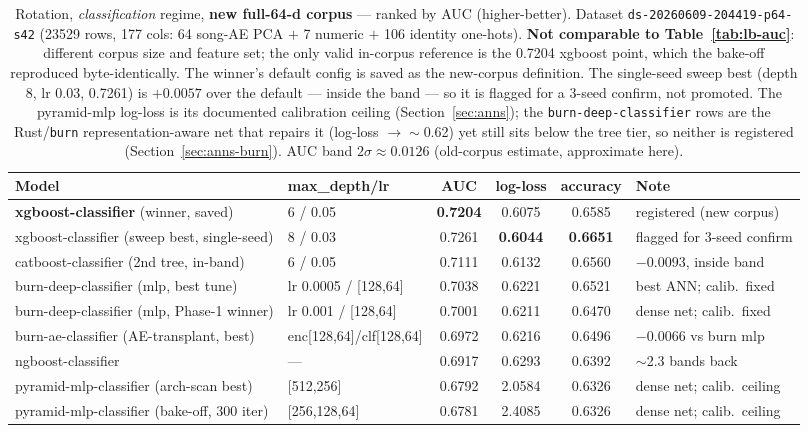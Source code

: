 \documentclass[11pt]{article}
\newcommand{\dsid}[1]{\texttt{\small #1}}
\newcommand{\best}[1]{\textbf{#1}}
\begin{document}
\begin{table}[ht]
  \centering
  \caption{Rotation, \emph{classification} regime, \textbf{new full-64-d
  corpus} --- ranked by AUC (higher-better). Dataset
  \dsid{ds-20260609-204419-p64-s42} (\num{23529} rows, 177 cols: 64 song-AE
  PCA $+$ 7 numeric $+$ 106 identity one-hots). \textbf{Not comparable to
  Table~\ref{tab:lb-auc}}: different corpus size and feature set; the only
  valid in-corpus reference is the \num{0.7204} xgboost point, which the
  bake-off reproduced byte-identically. The winner's default config is saved
  as the new-corpus definition. The single-seed sweep best (depth 8, lr 0.03,
  \num{0.7261}) is $+0.0057$ over the default --- inside the band --- so it is
  flagged for a 3-seed confirm, not promoted. The pyramid-mlp log-loss is its
  documented calibration ceiling (Section~\ref{sec:anns}); the
  \texttt{burn-deep-classifier} rows are the Rust/\texttt{burn}
  representation-aware net that repairs it (log-loss $\to\sim$0.62) yet still
  sits below the tree tier, so neither is registered
  (Section~\ref{sec:anns-burn}). AUC band $2\sigma\approx 0.0126$ (old-corpus
  estimate, approximate here).}
  \label{tab:lb-auc-p64}
  \begin{tabular}{llcccl}
    \toprule
    Model & max\_depth/lr & AUC & log-loss & accuracy & Note \\
    \midrule
    \best{xgboost-classifier} (winner, saved)      & 6 / 0.05  & \best{0.7204} & 0.6075 & 0.6585 & registered (new corpus) \\
    xgboost-classifier (sweep best, single-seed)   & 8 / 0.03  & 0.7261 & \best{0.6044} & \best{0.6651} & flagged for 3-seed confirm \\
    catboost-classifier (2nd tree, in-band)        & 6 / 0.05  & 0.7111 & 0.6132 & 0.6560 & $-0.0093$, inside band \\
    burn-deep-classifier (mlp, best tune)          & lr 0.0005 / [128,64] & 0.7038 & 0.6221 & 0.6521 & best ANN; calib.\ fixed \\
    burn-deep-classifier (mlp, Phase-1 winner)     & lr 0.001 / [128,64]  & 0.7001 & 0.6211 & 0.6470 & dense net; calib.\ fixed \\
    burn-ae-classifier (AE-transplant, best)       & enc[128,64]/clf[128,64] & 0.6972 & 0.6216 & 0.6496 & $-0.0066$ vs burn mlp \\
    ngboost-classifier                             & ---       & 0.6917 & 0.6293 & 0.6392 & $\sim$2.3 bands back \\
    pyramid-mlp-classifier (arch-scan best)        & [512,256] & 0.6792 & 2.0584 & 0.6326 & dense net; calib.\ ceiling \\
    pyramid-mlp-classifier (bake-off, 300 iter)    & [256,128,64] & 0.6781 & 2.4085 & 0.6326 & dense net; calib.\ ceiling \\
    \bottomrule
  \end{tabular}
\end{table}
\end{document}
